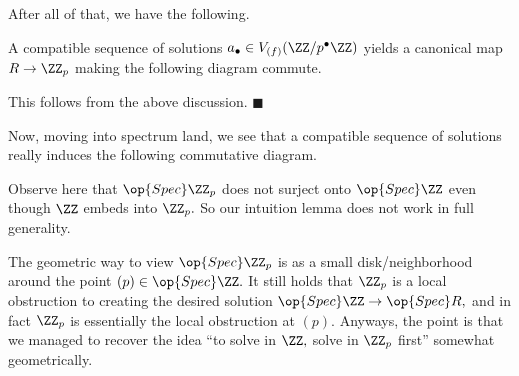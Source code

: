 After all of that, we have the following.
\begin{lemma}
    A compatible sequence of solutions $a_\bullet\in V_{(f)}(\ZZ/p^\bullet\ZZ)$ yields a canonical map $R\to\ZZ_p$ making the following diagram commute.
    \begin{center}
    \end{center}
\end{lemma}
This follows from the above discussion. $\blacksquare$

Now, moving into spectrum land, we see that a compatible sequence of solutions really induces the following commutative diagram.
\begin{center}
\end{center}
Observe here that $\op{Spec}\ZZ_p$ does not surject onto $\op{Spec}\ZZ$ even though $\ZZ$ embeds into $\ZZ_p.$ So our intuition lemma does not work in full generality.

The geometric way to view $\op{Spec}\ZZ_p$ is as a small disk/neighborhood around the point $(p)\in\op{Spec}\ZZ.$ It still holds that $\ZZ_p$ is a local obstruction to creating the desired solution $\op{Spec}\ZZ\to\op{Spec}R,$ and in fact $\ZZ_p$ is essentially the local obstruction at $(p).$ Anyways, the point is that we managed to recover the idea ``to solve in $\ZZ,$ solve in $\ZZ_p$ first'' somewhat geometrically.


